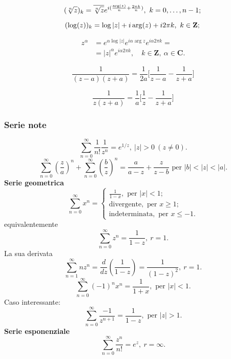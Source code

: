 \begin{equation*}
    (\sqrt[n]{z})_k=\overline{\sqrt[n]{z}}e^{i(\frac{\arg (z)}{n}+\frac{2\pi k}{n})},\ k=0,\dots,n-1;\\
\end{equation*}

\begin{equation*}
    (\log (z))_k = \log|z|+i\arg(z) + i2\pi k, \ k\in\mathbf{Z};\\
\end{equation*}

\begin{align*}
    z^\alpha &= e^{\alpha\log|z|}e^{i\alpha\arg z}e^{i\alpha 2\pi k}=\\ 
    &= |z|^\alpha e^{i\alpha 2\pi k}, \quad k\in\mathbf{Z}, \ \alpha\in\mathbf{C}.
\end{align*}

\begin{equation*}
    \frac{1}{(z-a)(z+a)}=\frac{1}{2a}\Big[ \frac{1}{z-a}-\frac{1}{z+a}\Big]
\end{equation*}

\begin{equation*}
    \frac{1}{z(z+a)}=\frac{1}{a}\Big[ \frac{1}{z}-\frac{1}{z+a}\Big]
\end{equation*}

\subsubsection*{Serie note}
\[
    \sum_{n=0}^{\infty}\frac{1}{n!}\frac{1}{z^n} = e^{1/z}, \ |z|>0 \ (z\neq0).
\]
\[
    \sum_{n=0}^{\infty}\left(\frac{z}{a}\right)^n + \sum_{n=0}^{\infty}\left(\frac{b}{z}\right)^n = \frac{a}{a-z} + \frac{z}{z-b} \text{ per } |b|<|z|<|a|.
\]
\textbf{Serie geometrica}
\[
\sum_{n=0}^{\infty}x^n=
\begin{cases}
  \frac{1}{1-x},\text{ per }|x|<1;\\
  \text{divergente},\text{ per }x\ge1;\\
  \text{indeterminata},\text{ per }x\le-1.
\end{cases}
\]
equivalentemente
\[
    \sum_{n=0}^{\infty} z^n = \frac{1}{1-z},\ r = 1.
\]
La sua derivata
\[
    \sum_{n=1}^{\infty} nz^n = \frac{d}{dz}\left(\frac{1}{1-z}\right) = \frac{1}{(1-z)^2},\ r = 1.
\]
\[
    \sum_{n=0}^{\infty}(-1)^n x^n=  \frac{1}{1+x},\text{ per }|x|<1.
\]
Caso interessante:
\[
    \sum_{n=0}^{\infty} \frac{-1}{z^{n+1}}=\frac{1}{1-z}, \text{ per } |z|>1.
\]
\textbf{Serie esponenziale}
\[
    \sum_{n=0}^{\infty}\frac{z^n}{n!}=e^z, \ r=\infty.
\]

